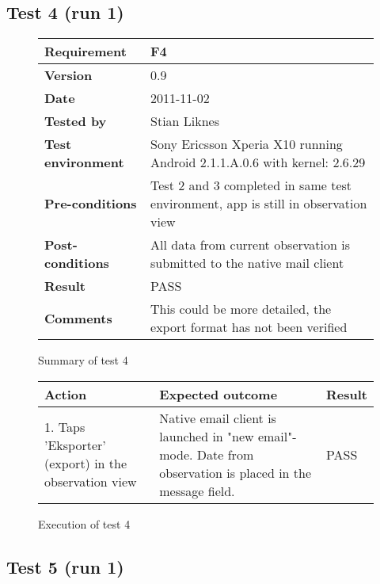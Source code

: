\newpage
\subsection*{Test 4 (run 1)}

	\begin{figure}[htb]
		\centering
		\begin{tabular}{|p{3.5cm}|p{7.0cm}|} \hline
			\textbf{Requirement} & F4 \\ \hline
			\textbf{Version} & 0.9 \\ \hline
			\textbf{Date} & 2011-11-02 \\ \hline
			\textbf{Tested by} & Stian Liknes \\ \hline
			\textbf{Test environment} & Sony Ericsson Xperia X10 running Android 2.1.1.A.0.6 with kernel: 2.6.29 \\ \hline
			\textbf{Pre-conditions} & Test 2 and 3 completed in same test environment, app is still in observation view \\ \hline
			\textbf{Post-conditions} & All data from current observation is submitted to the native mail client \\ \hline
			\textbf{Result} & PASS \\ \hline
			\textbf{Comments} & This could be more detailed, the export format has not been verified  \\ \hline
		\end{tabular}
		\caption{Summary of test 4}
	\end{figure}

	\begin{figure}[htb]
		\centering
		\begin{tabular}{|p{5.0cm}|p{5.0cm}|p{1cm}|}
			\hline \textbf{Action} & \textbf{Expected outcome} & \textbf{Result} \\ \hline
			1. Taps 'Eksporter' (export) in the observation view &
			Native email client is launched in "new email"-mode. Date from
			observation is placed in the message field. &
			PASS \\ \hline
		\end{tabular}
		\caption{Execution of test 4}
	\end{figure}

\newpage
\subsection*{Test 5 (run 1)}

